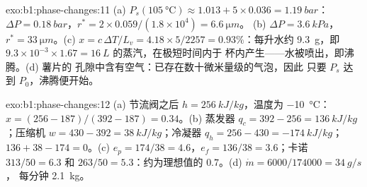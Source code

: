 \begin{solution}{exo:b1:phase-changes:11}
(a) $P_s(\qty{105}{\degreeCelsius}) \approx 1.013 + 5 \times 0.036 = \qty{1.19}{bar}$：
$\Delta P = \qty{0.18}{bar}$，$r^\ast = 2 \times 0.059/(1.8 \times 10^4) = \qty{6.6}{\micro m}$。
(b) $\Delta P = \qty{3.6}{kPa}$，$r^\ast = \qty{33}{\micro m}$。(c) $x = c\,\Delta T/L_v =
4.18 \times 5/2257 = 0.93\%$：每升水约 \qty{9.3}{g}，即 $9.3 \times 10^{-3}
\times 1.67 = \qty{16}{L}$ 的蒸汽，在极短时间内于
杯内产生——水被喷出，即沸腾。(d) 薯片的
孔隙中含有空气：已存在数十微米量级的气泡，因此
只要 $P_s$ 达到 $P_0$，沸腾便开始。
\end{solution}

\begin{solution}{exo:b1:phase-changes:12}
(a) 节流阀之后 $h = \qty{256}{kJ/kg}$，温度为 \qty{-10}{\degreeCelsius}：$x =
(256 - 187)/(392 - 187) = 0.34$。(b) 蒸发器 $q_c = 392 - 256 =
\qty{136}{kJ/kg}$；压缩机 $w = 430 - 392 = \qty{38}{kJ/kg}$；冷凝器
$q_h = 256 - 430 = \qty{-174}{kJ/kg}$；$136 + 38 - 174 = 0$。(c) $e_p =
174/38 = 4.6$，$e_f = 136/38 = 3.6$；卡诺 $313/50 = 6.3$ 和 $263/50 =
5.3$：约为理想值的 $0.7$。(d) $\dot m = 6000/174000 = \qty{34}{g/s}$，
每分钟 \qty{2.1}{kg}。
\end{solution}

